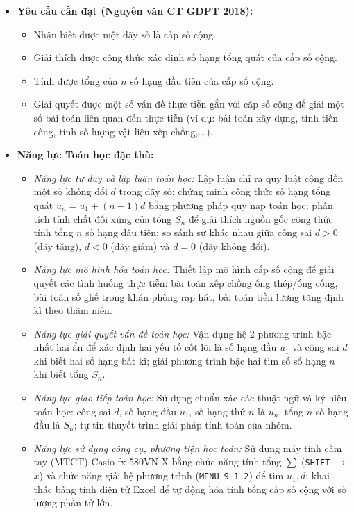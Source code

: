 \documentclass[12pt, a4paper]{article}
\begin{document}
\begin{itemize}[leftmargin=1.2cm]  
    \item \textbf{Yêu cầu cần đạt (Nguyên văn CT GDPT 2018):}  
    \begin{itemize}[leftmargin=0.6cm]  
        \item Nhận biết được một dãy số là cấp số cộng.  
        \item Giải thích được công thức xác định số hạng tổng quát của cấp số cộng.  
        \item Tính được tổng của $n$ số hạng đầu tiên của cấp số cộng.  
        \item Giải quyết được một số vấn đề thực tiễn gắn với cấp số cộng để giải một số bài toán liên quan đến thực tiễn (ví dụ: bài toán xây dựng, tính tiền công, tính số lượng vật liệu xếp chồng,...).  
    \end{itemize}  
  
    \item \textbf{Năng lực Toán học đặc thù:}  
    \begin{itemize}[leftmargin=0.6cm]  
        \item \textit{Năng lực tư duy và lập luận toán học:} Lập luận chỉ ra quy luật cộng dồn một số không đổi $d$ trong dãy số; chứng minh công thức số hạng tổng quát $u_n = u_1 + (n - 1)d$ bằng phương pháp quy nạp toán học; phân tích tính chất đối xứng của tổng $S_n$ để giải thích nguồn gốc công thức tính tổng $n$ số hạng đầu tiên; so sánh sự khác nhau giữa công sai $d > 0$ (dãy tăng), $d < 0$ (dãy giảm) và $d = 0$ (dãy không đổi).  
        \item \textit{Năng lực mô hình hóa toán học:} Thiết lập mô hình cấp số cộng để giải quyết các tình huống thực tiễn: bài toán xếp chồng ống thép/ống cống, bài toán số ghế trong khán phòng rạp hát, bài toán tiền lương tăng định kì theo thâm niên.  
        \item \textit{Năng lực giải quyết vấn đề toán học:} Vận dụng hệ 2 phương trình bậc nhất hai ẩn để xác định hai yếu tố cốt lõi là số hạng đầu $u_1$ và công sai $d$ khi biết hai số hạng bất kì; giải phương trình bậc hai tìm số số hạng $n$ khi biết tổng $S_n$.  
        \item \textit{Năng lực giao tiếp toán học:} Sử dụng chuẩn xác các thuật ngữ và ký hiệu toán học: công sai $d$, số hạng đầu $u_1$, số hạng thứ $n$ là $u_n$, tổng $n$ số hạng đầu là $S_n$; tự tin thuyết trình giải pháp tính toán của nhóm.  
        \item \textit{Năng lực sử dụng công cụ, phương tiện học toán:} Sử dụng máy tính cầm tay (MTCT) Casio fx-580VN X bằng chức năng tính tổng $\sum$ (\texttt{SHIFT} $\to$ $x$) và chức năng giải hệ phương trình (\texttt{MENU 9 1 2}) để tìm $u_1, d$; khai thác bảng tính điện tử Excel để tự động hóa tính tổng cấp số cộng với số lượng phần tử lớn.  
    \end{itemize}  
  

\end{itemize}
\end{document}
